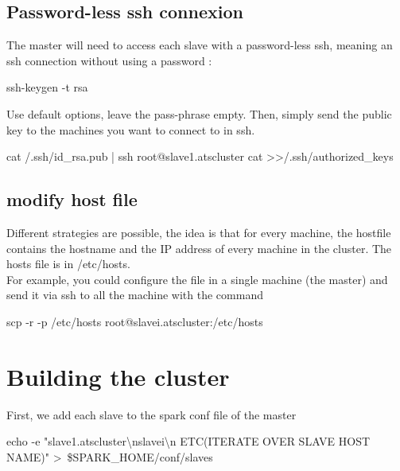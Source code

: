 \documentclass[a4paper]{article}
\begin{document}
\subsection{Password-less ssh connexion}
The master will need to access each slave with a password-less ssh, meaning an ssh connection without using a password :
\begin{center}
\begin{tcolorbox}[width=0.8\linewidth,colframe=black!5!white]
ssh-keygen -t rsa
\end{tcolorbox}
\end{center}
Use default options, leave the pass-phrase empty. Then, simply send the public key to the machines you want to connect to in ssh.
\begin{center}
\begin{tcolorbox}[width=0.9\linewidth,colframe=black!5!white]
cat \texttildelow/.ssh/id\_rsa.pub | ssh root@slave1.atscluster \textquotesingle cat \textgreater \textgreater \texttildelow/.ssh/authorized\_keys\textquotesingle
\end{tcolorbox}
\end{center}

\subsection{modify host file}
Different strategies are possible, the idea is that for every machine, the hostfile contains the hostname and the IP address of every machine in the cluster.
The hosts file is in /etc/hosts.
\\ For example, you could configure the file in a single machine (the master) and send it via ssh to all the machine with the command
\begin{center}
\begin{tcolorbox}[width=0.8\linewidth,colframe=black!5!white]
scp -r -p /etc/hosts root@slavei.atscluster:/etc/hosts
\end{tcolorbox}
\end{center}

\section{Building the cluster}

First, we add each slave to the spark conf file of the master
\begin{center}
\begin{tcolorbox}[width=0.9\linewidth,colframe=black!5!white]
echo -e "slave1.atscluster\textbackslash nslavei\textbackslash n ETC(ITERATE OVER SLAVE HOST NAME)" \textgreater\ \$SPARK\_HOME/conf/slaves
\end{tcolorbox}
\end{center}
\end{document}
